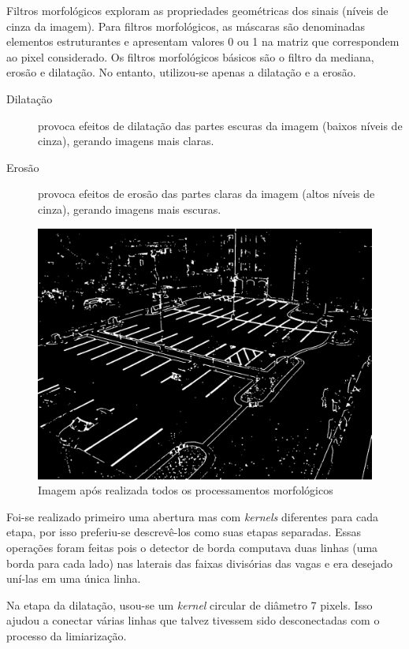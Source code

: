 \documentclass[10pt,twocolumn,letterpaper]{article}
\begin{document}
	Filtros morfológicos exploram as propriedades geométricas dos sinais (níveis de cinza
da imagem). Para filtros morfológicos, as máscaras são denominadas elementos
estruturantes e apresentam valores 0 ou 1 na matriz que correspondem ao pixel considerado.
Os filtros morfológicos básicos são o filtro da mediana, erosão e dilatação. No entanto,
utilizou-se apenas a dilatação e a erosão.

\begin{description}
\item [Dilatação] provoca efeitos de dilatação das partes escuras da imagem (baixos níveis
de cinza), gerando imagens mais claras.
\item [Erosão] provoca efeitos de erosão das partes claras da imagem (altos níveis de
cinza), gerando imagens mais escuras.
\end{description}


\begin{figure}[!htb]
\centering
\includegraphics[width=\columnwidth]{morph-operado.jpg}
\caption{Imagem após realizada todos os processamentos morfológicos}
\label{Rotulo}
\end{figure}

	Foi-se realizado primeiro uma abertura mas com \emph{kernels} diferentes para cada
etapa, por isso preferiu-se descrevê-los como suas etapas separadas. Essas operações foram
feitas pois o detector de borda computava duas linhas (uma borda para cada lado) nas laterais
das faixas divisórias das vagas e era desejado uní-las em uma única linha.

	Na etapa da dilatação, usou-se um \emph{kernel} circular de diâmetro 7 pixels. Isso ajudou
a conectar várias linhas que talvez tivessem sido desconectadas com o processo da limiarização.
\end{document}
